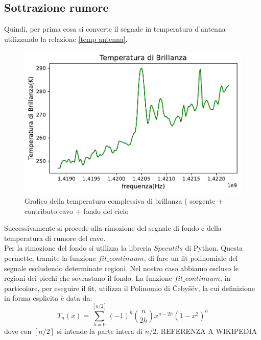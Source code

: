 \subsection{Sottrazione rumore}

Quindi, per prima cosa si converte il segnale in temperatura d'antenna utilizzando la relazione \eqref{temp antenna}.

\begin{figure}[H]
	\centering
	\includegraphics[scale=0.8]{Temperatura_brillanza_tutto.pdf}
	\caption{Grafico della temperatura complessiva di brillanza ( sorgente + contributo cavo + fondo del cielo}
    	\label{fig:Temperatura_brillanza_tutto}
\end{figure}

Successivamente si procede alla rimozione del segnale di fondo e della temperatura di rumore del cavo.\\
Per la rimozione del fondo si utilizza la libreria $Specutils$ di Python. Questa permette, tramite la funzione $fit\_continuum$, di fare un fit polinomiale del segnale escludendo determinate regioni. Nel nostro caso abbiamo escluso le regioni dei picchi che sovrastano il fondo. La funzione $fit\_continuum$, in particolare, per eseguire il fit, utilizza il Polinomio di Čebyšëv, la cui definizione in forma esplicita è data da:
\begin{equation}
    T_n(x)=\sum_{h=0}^{[n/2]} (-1)^h {n \choose 2h} x^{n-2h} (1-x^2)^h
\end{equation}
dove con $[n/2]$ si intende la parte intera di $n/2$. REFERENZA A WIKIPEDIA

